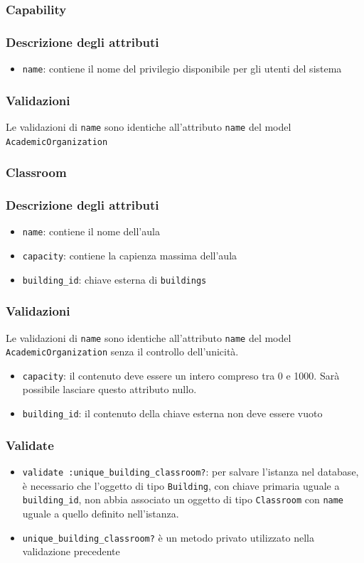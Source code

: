 \documentclass[11pt,a4paper]{article}
\begin{document}
\subsubsection{Capability}
\subsubsection*{Descrizione degli attributi}
\begin{itemize}
 \item \verb|name|: contiene il nome del privilegio disponibile per gli utenti del sistema
\end{itemize}
\subsubsection*{Validazioni}
Le validazioni di \verb|name| sono identiche all'attributo \verb|name| del model \\ \verb|AcademicOrganization|
\subsubsection{Classroom}
\subsubsection*{Descrizione degli attributi}
\begin{itemize}
 \item \verb|name|: contiene il nome dell'aula
 \item \verb|capacity|: contiene la capienza massima dell'aula
 \item \verb|building_id|: chiave esterna di \verb|buildings|
\end{itemize}
\subsubsection*{Validazioni}
Le validazioni di \verb|name| sono identiche all'attributo \verb|name| del model \\ \verb|AcademicOrganization| senza il controllo dell'unicità.
\begin{itemize}
\item \verb|capacity|: il contenuto deve essere un intero compreso tra 0 e 1000. Sarà possibile lasciare questo attributo nullo.
\item \verb|building_id|: il contenuto della chiave esterna non deve essere vuoto
\end{itemize}
\subsubsection*{Validate}
\begin{itemize}
 \item \verb|validate :unique_building_classroom?|: per salvare l'istanza nel database, è necessario che l'oggetto di tipo \verb|Building|, con chiave primaria uguale a \verb|building_id|, non abbia associato un oggetto di tipo \verb|Classroom| con \verb|name| uguale a quello definito nell'istanza.
\item \verb|unique_building_classroom?| è un metodo privato utilizzato nella validazione precedente
\end{itemize}
\end{document}

